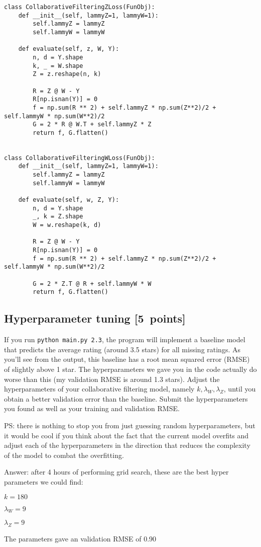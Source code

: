 \documentclass{article}
\newcommand{\blu}[1]{{\textcolor{blu}{#1}}}
\newenvironment{answer}{\par\begingroup\color{gre}Answer: }{\endgroup}
\let\ask\blu
\newcommand\pts[1]{\textcolor{pointscolour}{[#1~points]}}
\begin{document}
\begin{verbatim}
class CollaborativeFilteringZLoss(FunObj):
    def __init__(self, lammyZ=1, lammyW=1):
        self.lammyZ = lammyZ
        self.lammyW = lammyW

    def evaluate(self, z, W, Y):
        n, d = Y.shape
        k, _ = W.shape
        Z = z.reshape(n, k)

        R = Z @ W - Y
        R[np.isnan(Y)] = 0
        f = np.sum(R ** 2) + self.lammyZ * np.sum(Z**2)/2 + self.lammyW * np.sum(W**2)/2
        G = 2 * R @ W.T + self.lammyZ * Z
        return f, G.flatten()


class CollaborativeFilteringWLoss(FunObj):
    def __init__(self, lammyZ=1, lammyW=1):
        self.lammyZ = lammyZ
        self.lammyW = lammyW

    def evaluate(self, w, Z, Y):
        n, d = Y.shape
        _, k = Z.shape
        W = w.reshape(k, d)

        R = Z @ W - Y
        R[np.isnan(Y)] = 0
        f = np.sum(R ** 2) + self.lammyZ * np.sum(Z**2)/2 + self.lammyW * np.sum(W**2)/2
        
        G = 2 * Z.T @ R + self.lammyW * W
        return f, G.flatten()
\end{verbatim}
\newpage

\subsection{Hyperparameter tuning \pts{5}}
If you run \texttt{python main.py 2.3}, the program will implement a baseline model that predicts the average rating (around 3.5 stars) for all missing ratings.
As you'll see from the output, this baseline has a root mean squared error (RMSE) of slightly above 1 star. The hyperparameters we gave you in the code actually do worse than this (my validation RMSE is around 1.3 stars). \ask{Adjust the hyperparameters of your collaborative filtering model, namely $k,\lambda_W,\lambda_Z$, until you obtain a better validation error than the baseline. Submit the hyperparameters you found as well as your training and validation RMSE.}

PS: there is nothing to stop you from just guessing random hyperparameters, but it would be cool if you think about the fact that the current model overfits and adjust each of the hyperparameters in the direction that reduces the complexity of the model to combat the overfitting.
\begin{answer}
after 4 hours of performing grid search, these are the best hyper parameters we could find:

$k = 180$

$\lambda_W = 9$

$\lambda_Z = 9$

The parameters gave an validation RMSE of 0.90
    
\end{answer}
\newpage
\end{document}
